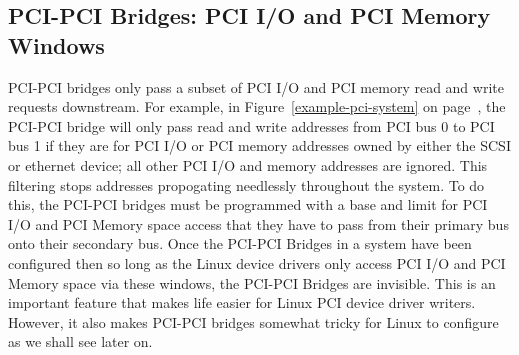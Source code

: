 \subsection{PCI-PCI Bridges: PCI I/O and PCI Memory Windows}
PCI-PCI bridges only pass a subset of PCI I/O and PCI memory read and 
write requests downstream.
For example, in Figure~\ref{example-pci-system} on 
page~\pageref{example-pci-system}, the PCI-PCI bridge will only 
pass read and write addresses from PCI bus 0 to PCI bus 1
if they are for PCI I/O or PCI memory addresses owned by either 
the SCSI or ethernet device; all other PCI I/O and memory addresses are ignored.
This filtering stops addresses propogating needlessly throughout the system.
To do this, the PCI-PCI bridges must be programmed with a base and limit for 
PCI I/O and PCI Memory space access that they have to pass 
from their primary bus onto their secondary bus.  
Once the PCI-PCI Bridges in a system have been configured 
then so long as the Linux device drivers only access PCI I/O and PCI 
Memory space via these windows, the PCI-PCI Bridges are invisible.
This is an important feature that makes life easier for 
Linux PCI device driver writers.
However, it also makes PCI-PCI bridges somewhat tricky for
Linux to configure as we shall see later on.

%

